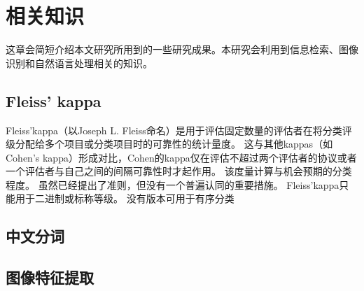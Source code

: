 \chapter{相关知识}

这章会简短介绍本文研究所用到的一些研究成果。本研究会利用到信息检索、图像识别和自然语言处理相关的知识。

\section{Fleiss' kappa}
Fleiss'kappa（以Joseph L. Fleiss命名）是用于评估固定数量的评估者在将分类评级分配给多个项目或分类项目时的可靠性的统计量度。 这与其他kappas（如Cohen's kappa）形成对比，Cohen的kappa仅在评估不超过两个评估者的协议或者一个评估者与自己之间的间隔可靠性时才起作用。 该度量计算与机会预期的分类程度。 虽然已经提出了准则，但没有一个普遍认同的重要措施。
Fleiss'kappa只能用于二进制或标称等级。 没有版本可用于有序分类


\section{中文分词}

\section{图像特征提取}